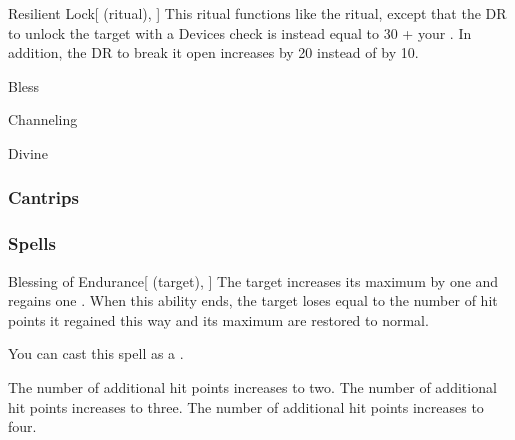 \lowercase{\hypertarget{spell:Resilient Lock}{}}\label{spell:Resilient Lock}
\begin{attuneability}[Rank 5]{\hypertarget{spell:Resilient Lock}{Resilient Lock}}[ (ritual), ]
This ritual functions like the  ritual, except that the DR to unlock the target with a Devices check is instead equal to 30 + your .
In addition, the DR to break it open increases by 20 instead of by 10.
\end{attuneability}
\vspace{0.25em}


\newpage
\begin{spellsection}{Bless}

\begin{spellheader}
\end{spellheader}


 Channeling

 Divine

\subsubsection{Cantrips}


\end{spellsection}


\subsubsection{Spells}


\lowercase{\hypertarget{spell:Blessing of Endurance}{}}\label{spell:Blessing of Endurance}
\begin{attuneability}[Rank 1]{\hypertarget{spell:Blessing of Endurance}{Blessing of Endurance}}[ (target), ]
The target increases its maximum  by one and regains one .
When this ability ends, the target loses  equal to the number of hit points it regained this way and its maximum  are restored to normal.

You can cast this spell as a .

\rankline
{} The number of additional hit points increases to two.
 The number of additional hit points increases to three.
 The number of additional hit points increases to four.
\end{attuneability}
\vspace{0.25em}



